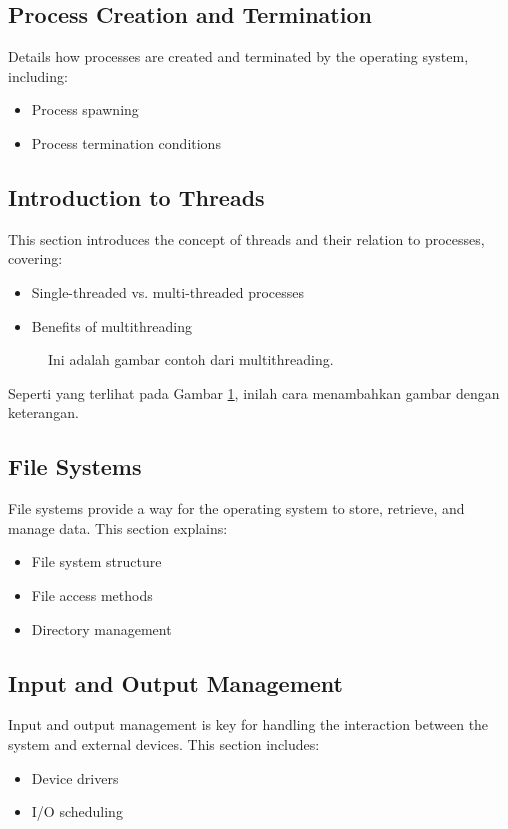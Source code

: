 \documentclass[12pt]{article}
\begin{document}
\subsection{Process Creation and Termination}
Details how processes are created and terminated by the operating system, including:
\begin{itemize}
    \item Process spawning
    \item Process termination conditions
\end{itemize}

\subsection{Introduction to Threads}
This section introduces the concept of threads and their relation to processes, covering:
\begin{itemize}
    \item Single-threaded vs. multi-threaded processes
    \item Benefits of multithreading
\end{itemize}

\begin{figure}[h]
    \centering
    \caption{Ini adalah gambar contoh dari multithreading.}
    \label{fig:contoh_gambar}
\end{figure}

Seperti yang terlihat pada Gambar \ref{fig:contoh_gambar}, inilah cara menambahkan gambar dengan keterangan.

\subsection{File Systems}
File systems provide a way for the operating system to store, retrieve, and manage data. This section explains:
\begin{itemize}
    \item File system structure
    \item File access methods
    \item Directory management
\end{itemize}

\subsection{Input and Output Management}
Input and output management is key for handling the interaction between the system and external devices. This section includes:
\begin{itemize}
    \item Device drivers
    \item I/O scheduling
\end{itemize}
\end{document}
